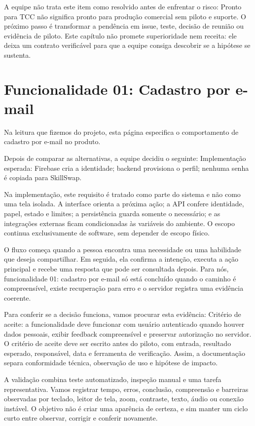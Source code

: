 \documentclass[12pt,oneside,a4paper,article]{abntex2}
\begin{document}
A equipe não trata este item como resolvido antes de enfrentar o risco: Pronto para TCC não significa pronto para produção comercial sem piloto e suporte. O próximo passo é transformar a pendência em issue, teste, decisão de reunião ou evidência de piloto. Este capítulo não promete superioridade nem receita: ele deixa um contrato verificável para que a equipe consiga descobrir se a hipótese se sustenta.

\section{Funcionalidade 01: Cadastro por e-mail}
Na leitura que fizemos do projeto, esta página especifica o comportamento de cadastro por e-mail no produto.

Depois de comparar as alternativas, a equipe decidiu o seguinte: Implementação esperada: Firebase cria a identidade; backend provisiona o perfil; nenhuma senha é copiada para SkillSwap.

Na implementação, este requisito é tratado como parte do sistema e não como uma tela isolada. A interface orienta a próxima ação; a API confere identidade, papel, estado e limites; a persistência guarda somente o necessário; e as integrações externas ficam condicionadas às variáveis do ambiente. O escopo continua exclusivamente de software, sem depender de escopo físico.

O fluxo começa quando a pessoa encontra uma necessidade ou uma habilidade que deseja compartilhar. Em seguida, ela confirma a intenção, executa a ação principal e recebe uma resposta que pode ser consultada depois. Para nós, funcionalidade 01: cadastro por e-mail só está concluído quando o caminho é compreensível, existe recuperação para erro e o servidor registra uma evidência coerente.

Para conferir se a decisão funciona, vamos procurar esta evidência: Critério de aceite: a funcionalidade deve funcionar com usuário autenticado quando houver dados pessoais, exibir feedback compreensível e preservar autorização no servidor. O critério de aceite deve ser escrito antes do piloto, com entrada, resultado esperado, responsável, data e ferramenta de verificação. Assim, a documentação separa conformidade técnica, observação de uso e hipótese de impacto.

A validação combina teste automatizado, inspeção manual e uma tarefa representativa. Vamos registrar tempo, erros, conclusão, compreensão e barreiras observadas por teclado, leitor de tela, zoom, contraste, texto, áudio ou conexão instável. O objetivo não é criar uma aparência de certeza, e sim manter um ciclo curto entre observar, corrigir e conferir novamente.
\end{document}
